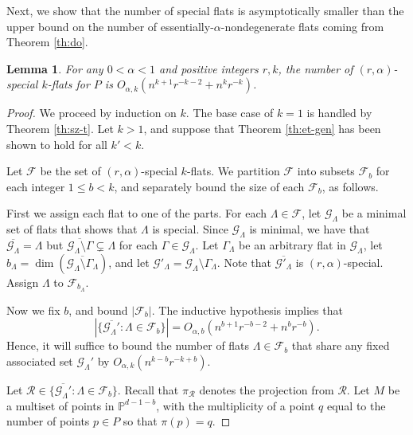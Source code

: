 \documentclass{article}
\newtheorem{lemma}[theorem]{Lemma}
\begin{document}
Next, we show that the number of special flats is asymptotically smaller than the upper bound on the number of essentially-$\alpha$-nondegenerate flats coming from Theorem \ref{th:do}.

\begin{lemma}\label{th:boundingSpecial}
	For any $0 < \alpha < 1$ and positive integers $r,k$, the number of $(r,\alpha)$-special $k$-flats for $P$ is $O_{\alpha,k}(n^{k+1}r^{-k-2} + n^k r^{-k})$.
\end{lemma}
\begin{proof}
	We proceed by induction on $k$.
	The base case of $k=1$ is handled by Theorem \ref{th:sz-t}.
	Let $k>1$, and suppose that Theorem \ref{th:et-gen} has been shown to hold for all $k' < k$.
	
	Let $\mathcal{F}$ be the set of $(r,\alpha)$-special $k$-flats.
	We partition $\mathcal{F}$ into subsets $\mathcal{F}_b$ for each integer $1 \leq b < k$, and separately bound the size of each $\mathcal{F}_b$, as follows.
	
	First we assign each flat to one of the parts.
	For each $\Lambda \in \mathcal{F}$, let $\mathcal{G}_\Lambda$ be a minimal set of flats that shows that $\Lambda$ is special.
	Since $\mathcal{G}_\Lambda$ is minimal, we have that  $\overline{\mathcal{G}_\Lambda} = \Lambda$ but $\overline{\mathcal{G}_\Lambda \setminus \Gamma} \subsetneq \Lambda$ for each $\Gamma \in \mathcal{G}_\Lambda$.
	Let $\Gamma_\Lambda$ be an arbitrary flat in $\mathcal{G}_\Lambda$, let $b_\Lambda = \dim(\overline{\mathcal{G}_\Lambda \setminus \Gamma_{\Lambda}})$, and let $\mathcal{G}'_\Lambda = \mathcal{G}_\Lambda \setminus \Gamma_\Lambda$.
	Note that $\overline{\mathcal{G}'_\Lambda}$ is $(r,\alpha)$-special.
	Assign $\Lambda$ to $\mathcal{F}_{b_\Lambda}$.
	
	
	Now we fix $b$, and bound $|\mathcal{F}_b|$.
	The inductive hypothesis implies that
	$$|\{\overline{\mathcal{G}_\Lambda'} : \Lambda \in \mathcal{F}_b\}| = O_{\alpha,b}(n^{b+1}r^{-b-2} + n^b r^{-b}).$$
	Hence, it will suffice to bound the number of flats $\Lambda \in \mathcal{F}_b$ that share any fixed associated set $\mathcal{G}_\Lambda'$ by  $O_{\alpha,k}(n^{k-b}r^{-k+b})$.
	
	Let $\mathcal{R} \in \{\overline{\mathcal{G}_\Lambda'} : \Lambda \in \mathcal{F}_b\}$.
	Recall that $\pi_\mathcal{R}$ denotes the projection from $\mathcal{R}$.
	Let $M$ be a multiset of points in $\mathbb{P}^{d-1-b}$, with the multiplicity of a point $q$ equal to the number of points $p \in P$ so that $\pi(p) = q$.
	

\end{proof}
\end{document}
